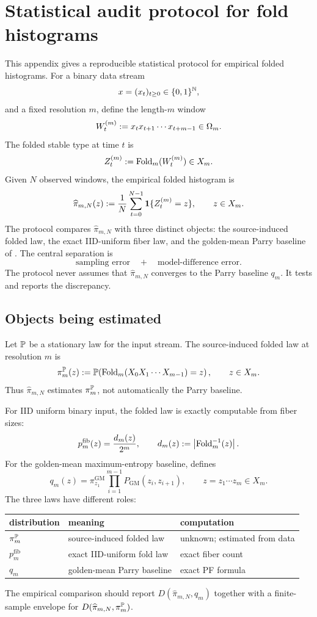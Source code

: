 \section{Statistical audit protocol for fold histograms}
\label{app:statistical-audit}

This appendix gives a reproducible statistical protocol for empirical folded histograms.  For a binary data stream
\[
x=(x_t)_{t\ge0}\in\{0,1\}^{\mathbb{N}},
\]
and a fixed resolution \(m\), define the length-\(m\) window
\[
W_t^{(m)}:=x_tx_{t+1}\cdots x_{t+m-1}\in\Omega_m.
\]
The folded stable type at time \(t\) is
\[
Z_t^{(m)}:=\operatorname{Fold}_m(W_t^{(m)})\in X_m.
\]
Given \(N\) observed windows, the empirical folded histogram is
\[
\widehat\pi_{m,N}(z)
:=
\frac1N\sum_{t=0}^{N-1}\mathbf{1}\{Z_t^{(m)}=z\},
\qquad z\in X_m.
\]
The protocol compares \(\widehat\pi_{m,N}\) with three distinct objects: the source-induced folded law, the exact IID-uniform fiber law, and the golden-mean Parry baseline of .  The central separation is
\[
\text{sampling error}\quad+\quad\text{model-difference error}.
\]
The protocol never assumes that \(\widehat\pi_{m,N}\) converges to the Parry baseline \(q_m\).  It tests and reports the discrepancy.

\subsection{Objects being estimated}

Let \(\mathbb{P}\) be a stationary law for the input stream.  The source-induced folded law at resolution \(m\) is
\[
\pi_m^{\mathbb{P}}(z)
:=
\mathbb{P}\!\left(\operatorname{Fold}_m(X_0X_1\cdots X_{m-1})=z\right),
\qquad z\in X_m.
\]
Thus \(\widehat\pi_{m,N}\) estimates \(\pi_m^{\mathbb{P}}\), not automatically the Parry baseline.

For IID uniform binary input, the folded law is exactly computable from fiber sizes:
\[
p_m^{\mathrm{fib}}(z)=\frac{d_m(z)}{2^m},
\qquad
d_m(z):=\left|\operatorname{Fold}_m^{-1}(z)\right|.
\]
For the golden-mean maximum-entropy baseline,  defines
\[
q_m(z)=\pi_{z_1}^{\mathrm{GM}}\prod_{i=1}^{m-1}
P_{\mathrm{GM}}(z_i,z_{i+1}),
\qquad z=z_1\cdots z_m\in X_m.
\]
The three laws have different roles:
\begin{center}
\begin{tabular}{lll}
\toprule
distribution & meaning & computation\\
\midrule
\(\pi_m^{\mathbb{P}}\) & source-induced folded law & unknown; estimated from data\\
\(p_m^{\mathrm{fib}}\) & exact IID-uniform fold law & exact fiber count\\
\(q_m\) & golden-mean Parry baseline & exact PF formula\\
\bottomrule
\end{tabular}
\end{center}
The empirical comparison should report \(D(\widehat\pi_{m,N},q_m)\) together with a finite-sample envelope for \(D(\widehat\pi_{m,N},\pi_m^{\mathbb{P}})\).

